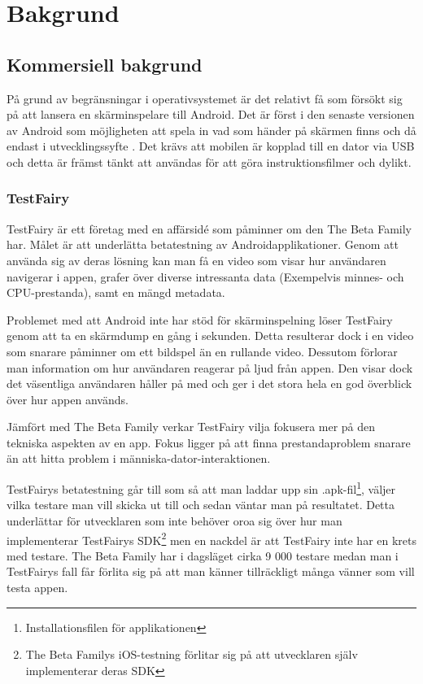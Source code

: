\section{Bakgrund}
\subsection{Kommersiell bakgrund}
På grund av begränsningar i operativsystemet är det relativt få som försökt sig på att lansera en skärminspelare till Android. Det är först i den senaste versionen av Android som möjligheten att spela in vad som händer på skärmen finns och då endast i utvecklingssyfte \parencite{kitkat}. Det krävs att mobilen är kopplad till en dator via USB och detta är främst tänkt att användas för att göra instruktionsfilmer och dylikt.

\subsubsection{TestFairy}
\label{testfairy}
TestFairy är ett företag med en affärsidé som påminner om den The Beta Family har. Målet är att underlätta betatestning av Androidapplikationer. Genom att använda sig av deras lösning kan man få en video som visar hur användaren navigerar i appen, grafer över diverse intressanta data (Exempelvis minnes- och CPU-prestanda), samt en mängd metadata.

Problemet med att Android inte har stöd för skärminspelning löser TestFairy genom att ta en skärmdump en gång i sekunden. Detta resulterar dock i en video som snarare påminner om ett bildspel än en rullande video. Dessutom förlorar man information om hur användaren reagerar på ljud från appen. Den visar dock det väsentliga användaren håller på med och ger i det stora hela en god överblick över hur appen används.

Jämfört med The Beta Family verkar TestFairy vilja fokusera mer på den tekniska aspekten av en app. Fokus ligger på att finna  prestandaproblem snarare än att hitta problem i människa-dator-interaktionen. 

TestFairys betatestning går till som så att man laddar upp sin .apk-fil\footnote{Installationsfilen för applikationen}, väljer vilka testare man vill skicka ut till och sedan väntar man på resultatet. Detta underlättar för utvecklaren som inte behöver oroa sig över hur man implementerar TestFairys SDK\footnote{The Beta Familys iOS-testning förlitar sig på att utvecklaren själv implementerar deras SDK} men en nackdel är att TestFairy inte har en krets med testare. The Beta Family har i dagsläget cirka 9 000 testare medan man i TestFairys fall får förlita sig på att man känner tillräckligt många vänner som vill testa appen.

